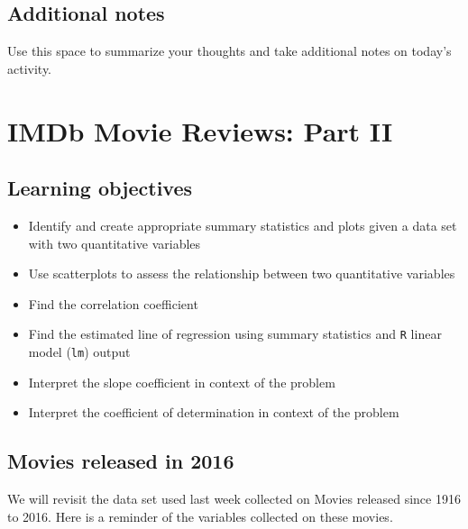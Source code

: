 \documentclass[
]{report}
\begin{document}
\hypertarget{additional-notes}{%
\section{Additional notes}\label{additional-notes}}

Use this space to summarize your thoughts and take additional notes on today's activity.

\hypertarget{imdb-movie-reviews-part-ii}{%
\chapter{IMDb Movie Reviews: Part II}\label{imdb-movie-reviews-part-ii}}

\hypertarget{learning-objectives}{%
\section{Learning objectives}\label{learning-objectives}}

\begin{itemize}
\item
  Identify and create appropriate summary statistics and plots
  given a data set with two quantitative variables
\item
  Use scatterplots to assess the relationship between two quantitative variables
\item
  Find the correlation coefficient
\item
  Find the estimated line of regression using summary statistics and \texttt{R} linear model (\texttt{lm}) output
\item
  Interpret the slope coefficient in context of the problem
\item
  Interpret the coefficient of determination in context of the problem
\end{itemize}

\hypertarget{movies-released-in-2016}{%
\section{Movies released in 2016}\label{movies-released-in-2016}}

We will revisit the data set used last week collected on Movies released since 1916 to 2016. Here is a reminder of the variables collected on these movies.
\end{document}
